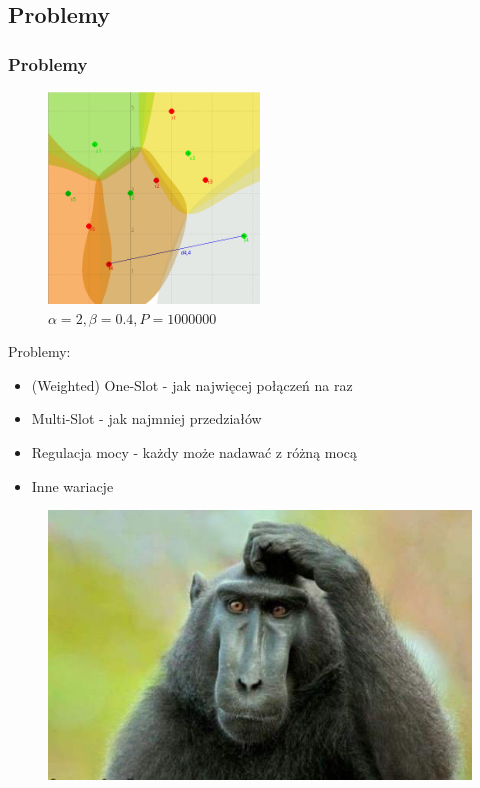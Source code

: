 \documentclass[polish, t,10pt]{beamer}
\begin{document}
\subsection{Problemy}
    \begin{frame}
        \frametitle{Problemy}
        \begin{figure}
            \includegraphics[width=0.5\textwidth]{pictures/model-diagram4.png}
            \caption{$\alpha=2, \beta=0.4, P=1000000$}
        \end{figure}
        Problemy:
        \begin{itemize}
            \item (Weighted) One-Slot - jak najwięcej połączeń na raz
            \item Multi-Slot - jak najmniej przedziałów
            \item Regulacja mocy - każdy może nadawać z różną mocą
            \item Inne wariacje
        \end{itemize}
    \end{frame}

\begin{frame}[c]
    \begin{figure}
        \includegraphics[width=\textwidth]{pictures/obligatory-monkey.jpg}
    \end{figure}
\end{frame}
\end{document}
